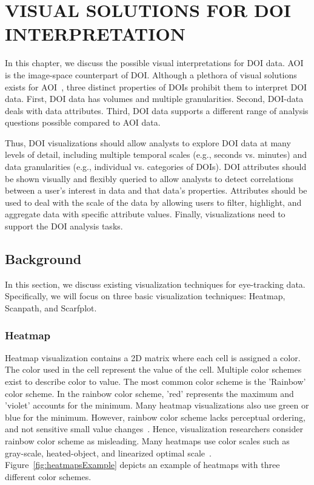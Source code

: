 \chapter{VISUAL SOLUTIONS FOR DOI INTERPRETATION}
\label{chap:DOIVis}
In this chapter, we discuss the possible visual interpretations for DOI data. AOI is the image-space counterpart of DOI. Although a plethora of visual solutions exists for AOI~\cite{Bla14}, three distinct properties of DOIs prohibit them to interpret DOI data. First, DOI data has volumes and multiple granularities. Second, DOI-data deals with data attributes. Third, DOI data supports a different range of analysis questions possible compared to AOI data. 

Thus, DOI visualizations should allow analysts to explore DOI data at many levels of detail, including multiple temporal scales (e.g., seconds vs. minutes) and data granularities (e.g., individual vs. categories of DOIs).  DOI attributes should be shown visually and flexibly queried to allow analysts to detect correlations between a user's interest in data and that data's properties. Attributes should be used to deal with the scale of the data by allowing users to filter, highlight, and aggregate data with specific attribute values. Finally, visualizations need to support the DOI analysis tasks. 



\section{Background}
\label{sec:ClassicVisualization}
In this section, we discuss existing visualization techniques for eye-tracking data. Specifically, we will focus on three basic visualization techniques: Heatmap, Scanpath, and Scarfplot. %

\subsection{Heatmap}
Heatmap visualization contains a 2D matrix where each cell is assigned a color. The color used in the cell represent the value of the cell. Multiple color schemes exist to describe color to value. The most common color scheme is the 'Rainbow' color scheme. In the rainbow color scheme, 'red' represents the maximum and 'violet' accounts for the minimum. Many heatmap visualizations also use green or blue for the minimum. However, rainbow color scheme lacks perceptual ordering, and not sensitive small value changes~\cite{borland2007rainbow}. Hence, visualization researchers consider rainbow color scheme as misleading. Many heatmaps use color scales such as gray-scale, heated-object, and linearized optimal scale~\cite{silva2007there}. Figure~\ref{fig:heatmapsExample} depicts an example of heatmaps with three different color schemes. 

